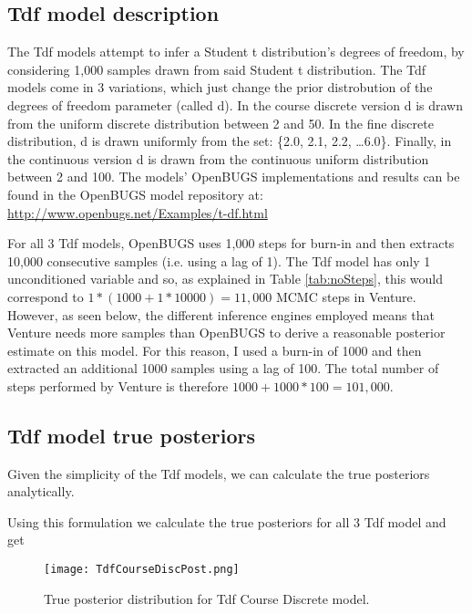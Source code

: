 \subsection{Tdf model description}
The Tdf models attempt to infer a Student t distribution’s degrees of freedom, by considering 1,000 samples drawn from said Student t distribution. The Tdf models come in 3 variations, which just change the prior distrobution of the degrees of freedom parameter (called d). In the course discrete version d is drawn from the uniform discrete distribution between 2 and 50. In the fine discrete distribution, d is drawn uniformly from the set: \{2.0, 2.1, 2.2, \ldots 6.0\}. Finally, in the continuous version d is drawn from the continuous uniform distribution between 2 and 100. The models' OpenBUGS implementations and results can be found in the OpenBUGS model repository at: \url{http://www.openbugs.net/Examples/t-df.html}

For all 3 Tdf models, OpenBUGS uses 1,000 steps for burn-in and then extracts 10,000 consecutive samples (i.e. using a lag of 1). The Tdf model has only 1 unconditioned variable and so, as explained in Table \ref{tab:noSteps}, this would correspond to \( 1 * (1000 + 1 * 10000) = 11,000 \) MCMC steps in Venture. However, as seen below, the different inference engines employed means that Venture needs more samples than OpenBUGS to derive a reasonable posterior estimate on this model. For this reason, I used a burn-in of 1000 and then extracted an additional 1000 samples using a lag of 100. The total number of steps performed by Venture is therefore \( 1000 + 1000 * 100 = 101,000 \).

\subsection{Tdf model true posteriors}
Given the simplicity of the Tdf models, we can calculate the true posteriors analytically.


Using this formulation we calculate the true posteriors for all 3 Tdf model and get

\begin{figure}[H]
    \centering
    \texttt{[image: TdfCourseDiscPost.png]}
    \caption{True posterior distribution for Tdf Course Discrete model.}
    \label{fig:tdfCourseDiscSamp}
\end{figure}

